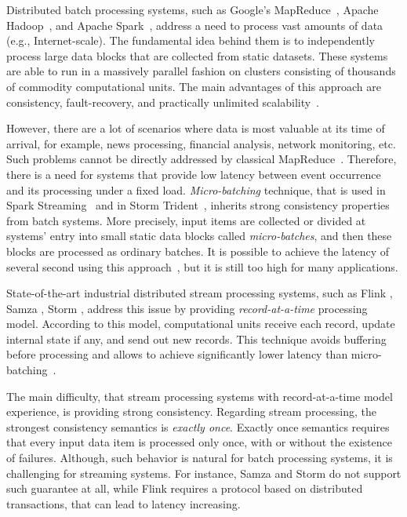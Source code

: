 
\label {fs-intro-seciton}

Distributed batch processing systems, such as Google's MapReduce~\cite{Dean:2008:MSD:1327452.1327492}, Apache Hadoop~\cite{hadoop2009hadoop}, and Apache Spark~\cite{Zaharia:2016:ASU:3013530.2934664}, address a need to process vast amounts of data (e.g., Internet-scale). The fundamental idea behind them is to independently process large data blocks that are collected from static datasets. These systems are able to run in a massively parallel fashion on clusters consisting of thousands of commodity computational units. The main advantages of this approach are consistency, fault-recovery, and practically unlimited scalability~\cite{borthakur2011apache}.

However, there are a lot of scenarios where data is most valuable at its time of arrival, for example, news processing, financial analysis, network monitoring, etc. Such problems cannot be directly addressed by classical MapReduce~\cite{Doulkeridis:2014:SLA:2628707.2628782}. Therefore, there is a need for systems that provide low latency between event occurrence and its processing under a fixed load. {\it Micro-batching} technique, that is used in Spark Streaming~\cite{Zaharia:2012:DSE:2342763.2342773} and in Storm Trident~\cite{apache:storm:trident}, inherits strong consistency properties from batch systems. More precisely, input items are collected or divided at systems' entry into small static data blocks called {\it micro-batches}, and then these blocks are processed as ordinary batches. It is possible to achieve the latency of several second using this approach~\cite{7530084, 7474816}, but it is still too high for many applications.

State-of-the-art industrial distributed stream processing systems, such as Flink \cite{carbone2015apache}, Samza \cite{Noghabi:2017:SSS:3137765.3137770}, Storm \cite{apache:storm}, address this issue by providing {\it record-at-a-time} processing model. According to this model, computational units receive each record, update internal state if any, and send out new records. This technique avoids buffering before processing and allows to achieve significantly lower latency than micro-batching~\cite{7530084}.

The main difficulty, that stream processing systems with record-at-a-time model experience, is providing strong consistency. Regarding stream processing, the strongest consistency semantics is {\it exactly once}. Exactly once semantics requires that every input data item is processed only once, with or without the existence of failures. Although, such behavior is natural for batch processing systems, it is challenging for streaming systems. For instance, Samza and Storm do not support such guarantee at all, while Flink requires a protocol based on distributed transactions, that can lead to latency increasing.

